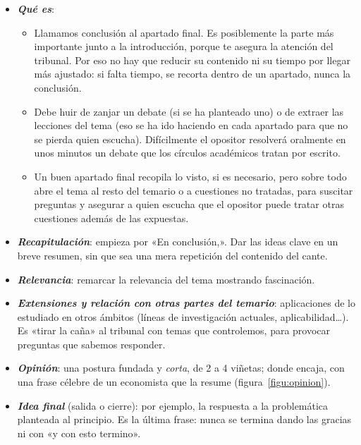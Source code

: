 \documentclass[11pt]{article}
\begin{document}
\begin{itemize}
\item \textbf{\emph{Qué es}}:
  \begin{itemize}
  \item Llamamos conclusión al apartado final. Es posiblemente la parte más importante junto a la introducción, porque te asegura la atención del tribunal. Por eso no hay que reducir su contenido ni su tiempo por llegar más ajustado: si falta tiempo, se recorta dentro de un apartado, nunca la conclusión.
  \item Debe huir de zanjar un debate (si se ha planteado uno) o de extraer las lecciones del tema (eso se ha ido haciendo en cada apartado para que no se pierda quien escucha). Difícilmente el opositor resolverá oralmente en unos minutos un debate que los círculos académicos tratan por escrito.
  \item Un buen apartado final recopila lo visto, si es necesario, pero sobre todo abre el tema al resto del temario o a cuestiones no tratadas, para suscitar preguntas y asegurar a quien escucha que el opositor puede tratar otras cuestiones además de las expuestas.
  \end{itemize}
\item \textbf{\emph{Recapitulación}}: empieza por «En conclusión,». Dar las ideas clave en un breve resumen, sin que sea una mera repetición del contenido del cante.
\item \textbf{\emph{Relevancia}}: remarcar la relevancia del tema mostrando fascinación.
\item \textbf{\emph{Extensiones y relación con otras partes del temario}}: aplicaciones de lo estudiado en otros ámbitos (líneas de investigación actuales, aplicabilidad…). Es «tirar la caña» al tribunal con temas que controlemos, para provocar preguntas que sabemos responder.
\item \textbf{\emph{Opinión}}: una postura fundada y \emph{corta}, de 2 a 4 viñetas; donde encaja, con una frase célebre de un economista que la resume (figura~\ref{figu:opinion}).
\item \textbf{\emph{Idea final}} (salida o cierre): por ejemplo, la respuesta a la problemática planteada al principio. Es la última frase: nunca se termina dando las gracias ni con «y con esto termino».
\end{itemize}
\end{document}

